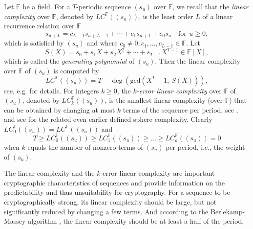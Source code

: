 \documentclass [11pt,a4paper]{article}
\def\F{\mathbb{F}}
\begin{document}
Let $\F$ be a field.  For a $T$-periodic
sequence $(s_u)$ over $\F$, we recall that the
\emph{linear complexity} over $\F$, denoted by  $LC^{\F}((s_u))$, is the least order $L$ of a linear
recurrence relation over $\mathbb{F}$
$$
s_{u+L} = c_{L-1}s_{u+L-1} +\cdots +c_1s_{u+1}+ c_0s_u\quad
\mathrm{for}\,\ u \geq 0,
$$
which is satisfied by $(s_u)$ and where $c_0\neq 0, c_1, \ldots,
c_{L-1}\in \mathbb{F}$.
Let
$$
S(X)=s_0+s_1X+s_2X^2+\cdots+s_{T-1}X^{T-1}\in \mathbb{F}[X],
$$
which is called the \emph{generating polynomial} of $(s_u)$. Then the linear
complexity over $\F$ of $(s_u)$ is computed by
\begin{equation}\label{licom}
  LC^{\F}((s_u)) =T-\deg\left(\mathrm{gcd}(X^T-1,
  ~S(X))\right),
\end{equation}
see, e.g. \cite{LN} for details. For integers $k\ge 0$, the \emph{$k$-error linear complexity} over $\F$ of $(s_u)$, denoted by $LC^{\F}_k((s_u))$, is the smallest linear complexity (over $\F$) that can be
obtained by changing at most $k$ terms of the sequence per period, see \cite{SM,Meidl}, and see \cite{DXS} for the related even earlier defined sphere complexity.  Clearly $LC^{\F}_0((s_u))=LC^{\F}((s_u))$ and
$$
T\ge LC^{\F}_0((s_u))\ge LC^{\F}_1((s_u))\ge \ldots \ge LC^{\F}_k((s_u))=0
$$
when $k$ equals the number of nonzero terms of $(s_u)$ per period, i.e., the weight of $(s_u)$.


The linear complexity and the $k$-error linear complexity are important cryptographic characteristics of sequences
and provide information on the predictability and thus unsuitability for cryptography. For a sequence to be cryptographically strong, its linear complexity
should be large, but not significantly reduced by changing a few
terms. And according to  the Berlekamp-Massey
algorithm \cite{Massey}, the linear complexity
should be at least a half of the period.
\end{document}
